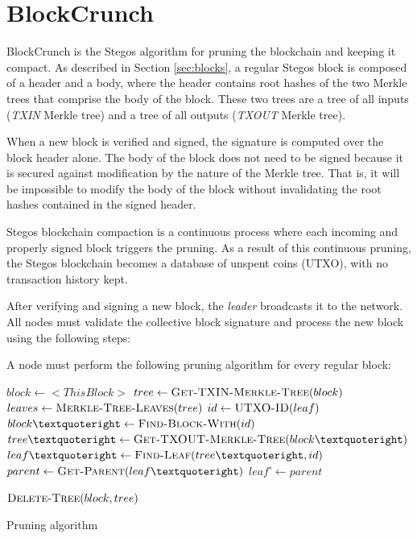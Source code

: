 \documentclass[8pt,fleqn,openany]{book}
\begin{document}
	\section{BlockCrunch}\label{sec:pruning}
	BlockCrunch is the Stegos algorithm for pruning the blockchain and keeping it compact. As described in Section \ref{sec:blocks}, a regular Stegos block is composed of a header and a body, where the header contains root hashes of the two Merkle trees that comprise the body of the block. These two trees are a tree of all inputs (\textit{TXIN} Merkle tree) and a tree of all outputs (\textit{TXOUT} Merkle tree). 
	
	When a new block is verified and signed, the signature is computed over the block header alone. The body of the block does not need to be signed because it is secured against modification by the nature of the Merkle tree. That is, it will be impossible to modify the body of the block without invalidating the root hashes contained in the signed header.
	
	Stegos blockchain compaction is a continuous process where each incoming and properly signed block triggers the pruning. As a result of this continuous pruning, the Stegos blockchain becomes a database of unspent coins (UTXO), with no transaction history kept.
	
	After verifying and signing a new block, the \textit{leader} broadcasts it to the network. All nodes must validate the collective block signature and process the new block using the following steps:
	
	A node must perform the following pruning algorithm for every regular block:
	
	\begin{algorithm}
		\begin{algorithmic}
			\State $block \gets <This Block>$
			\State $tree \gets \Call{Get-TXIN-Merkle-Tree}{block}$
			\State $leaves \gets \Call{Merkle-Tree-Leaves}{tree}$
			\State $id \gets \Call{UTXO-ID}{leaf}$
			\State $block’ \gets \Call{Find-Block-With}{id}$
			\State $tree’ \gets \Call{Get-TXOUT-Merkle-Tree}{block’}$
			\State $leaf’ \gets \Call{Find-Leaf}{tree’, id}$
			\State {} 
			\State $parent \gets \Call{Get-Parent}{leaf’}$
			\State {}
			\State {} 
			\State {}
			\State $leaf’ \gets parent$
			\EndFor
			\EndFor
			
			\State $\Call{Delete-Tree}{block, tree}$ 
			\EndIf
			
		\end{algorithmic}
		\caption{Pruning algorithm}
		\label{code:pruning}
	\end{algorithm}
	
\end{document}
